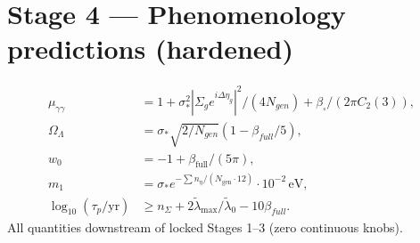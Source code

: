 \documentclass{article}
\begin{document}
\section{Stage 4 --- Phenomenology predictions (hardened)}
\begin{align}
\mu_{\gamma\gamma} &= 1 + \sigma_*^2|\Sigma_g e^{i\Delta\eta_g}|^2/(4N_{gen}) + \beta_{\square}/(2\pi C_2(3)), \\
\Omega_\Lambda &= \sigma_*\sqrt{2/N_{gen}}(1 - \beta_{full}/5), \\
w_0 &= -1 + \beta_{\mathrm{full}}/(5\pi), \\
m_1 &= \sigma_* e^{-\sum n_\eta/(N_{\mathrm{gen}}\cdot 12)}\cdot 10^{-2}\,\mathrm{eV}, \\
\log_{10}(\tau_p/\mathrm{yr}) &\geq n_\Sigma + 2\tilde\lambda_{\max}/\tilde\lambda_0 - 10\beta_{full}.
\end{align}
All quantities downstream of locked Stages 1--3 (zero continuous knobs).
\end{document}
